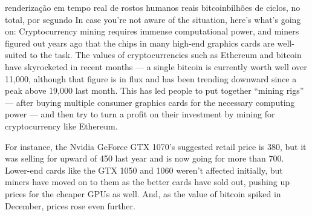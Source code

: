 renderização em tempo real de rostos humanos reais
bitcoinbilhões de ciclos, no total, por segundo
In case you’re not aware of the situation, here’s what’s going on: Cryptocurrency mining requires immense computational power, and miners figured out years ago that the chips in many high-end graphics cards are well-suited to the task. The values of cryptocurrencies such as Ethereum and bitcoin have skyrocketed in recent months — a single bitcoin is currently worth well over 11,000, although that figure is in flux and has been trending downward since a peak above 19,000 last month. This has led people to put together “mining rigs” — after buying multiple consumer graphics cards for the necessary computing power — and then try to turn a profit on their investment by mining for cryptocurrency like Ethereum.

For instance, the Nvidia GeForce GTX 1070’s suggested retail price is 380, but it was selling for upward of 450 last year and is now going for more than 700. Lower-end cards like the GTX 1050 and 1060 weren’t affected initially, but miners have moved on to them as the better cards have sold out, pushing up prices for the cheaper GPUs as well. And, as the value of bitcoin spiked in December, prices rose even further.
